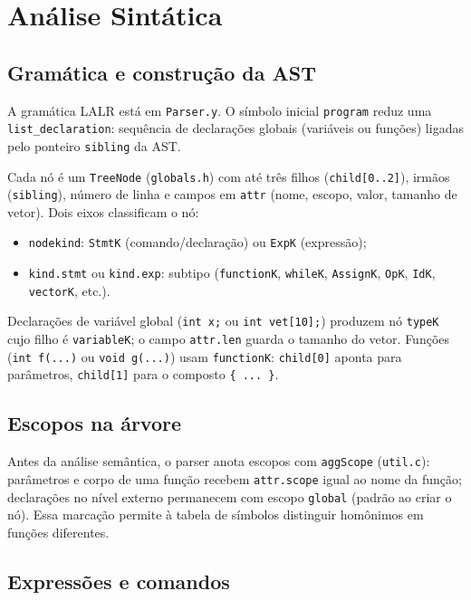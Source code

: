 \documentclass[
	12pt,				%
	openright,			%
	a4paper,			%
	english,			%
	french,				%
	spanish,			%
	brazil,				%
	]{abntex2}
\begin{document}
\section{Análise Sintática}

\subsection{Gramática e construção da AST}

A gramática LALR está em \texttt{Parser.y}. O símbolo inicial \texttt{program} reduz uma \texttt{list\_declaration}: sequência de declarações globais (variáveis ou funções) ligadas pelo ponteiro \texttt{sibling} da AST.

Cada nó é um \texttt{TreeNode} (\texttt{globals.h}) com até três filhos (\texttt{child[0..2]}), irmãos (\texttt{sibling}), número de linha e campos em \texttt{attr} (nome, escopo, valor, tamanho de vetor). Dois eixos classificam o nó:
\begin{itemize}
    \item \texttt{nodekind}: \texttt{StmtK} (comando/declaração) ou \texttt{ExpK} (expressão);
    \item \texttt{kind.stmt} ou \texttt{kind.exp}: subtipo (\texttt{functionK}, \texttt{whileK}, \texttt{AssignK}, \texttt{OpK}, \texttt{IdK}, \texttt{vectorK}, etc.).
\end{itemize}

Declarações de variável global (\texttt{int x;} ou \texttt{int vet[10];}) produzem nó \texttt{typeK} cujo filho é \texttt{variableK}; o campo \texttt{attr.len} guarda o tamanho do vetor. Funções (\texttt{int f(...)} ou \texttt{void g(...)}) usam \texttt{functionK}: \texttt{child[0]} aponta para parâmetros, \texttt{child[1]} para o composto \texttt{\{ ... \}}.

\subsection{Escopos na árvore}

Antes da análise semântica, o parser anota escopos com \texttt{aggScope} (\texttt{util.c}): parâmetros e corpo de uma função recebem \texttt{attr.scope} igual ao nome da função; declarações no nível externo permanecem com escopo \texttt{global} (padrão ao criar o nó). Essa marcação permite à tabela de símbolos distinguir homônimos em funções diferentes.

\subsection{Expressões e comandos}
\end{document}
